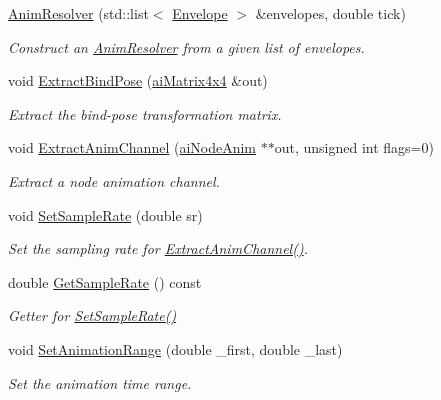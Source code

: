 \begin{DoxyCompactItemize}
\item 
\hyperlink{class_assimp_1_1_l_w_o_1_1_anim_resolver_a23fc374237cc755ae90e78fe2910a603}{Anim\+Resolver} (std\+::list$<$ \hyperlink{struct_assimp_1_1_l_w_o_1_1_envelope}{Envelope} $>$ \&envelopes, double tick)
\begin{DoxyCompactList}\small\item\em Construct an \hyperlink{class_assimp_1_1_l_w_o_1_1_anim_resolver}{Anim\+Resolver} from a given list of envelopes. \end{DoxyCompactList}\item 
void \hyperlink{class_assimp_1_1_l_w_o_1_1_anim_resolver_a9a10f3c63cbfa627b45c80cd4eca89e0}{Extract\+Bind\+Pose} (\hyperlink{structai_matrix4x4}{ai\+Matrix4x4} \&out)
\begin{DoxyCompactList}\small\item\em Extract the bind-\/pose transformation matrix. \end{DoxyCompactList}\item 
void \hyperlink{class_assimp_1_1_l_w_o_1_1_anim_resolver_a12c37cb4c519b65845333158ba72597f}{Extract\+Anim\+Channel} (\hyperlink{structai_node_anim}{ai\+Node\+Anim} $\ast$$\ast$out, unsigned int flags=0)
\begin{DoxyCompactList}\small\item\em Extract a node animation channel. \end{DoxyCompactList}\item 
void \hyperlink{class_assimp_1_1_l_w_o_1_1_anim_resolver_a7d58e5b987880986075c268e6a3233b1}{Set\+Sample\+Rate} (double sr)
\begin{DoxyCompactList}\small\item\em Set the sampling rate for \hyperlink{class_assimp_1_1_l_w_o_1_1_anim_resolver_a12c37cb4c519b65845333158ba72597f}{Extract\+Anim\+Channel()}. \end{DoxyCompactList}\item 
\hypertarget{class_assimp_1_1_l_w_o_1_1_anim_resolver_ad107c71e96b0fd5f6cc76b0ebcef4a6f}{double \hyperlink{class_assimp_1_1_l_w_o_1_1_anim_resolver_ad107c71e96b0fd5f6cc76b0ebcef4a6f}{Get\+Sample\+Rate} () const }\label{class_assimp_1_1_l_w_o_1_1_anim_resolver_ad107c71e96b0fd5f6cc76b0ebcef4a6f}

\begin{DoxyCompactList}\small\item\em Getter for \hyperlink{class_assimp_1_1_l_w_o_1_1_anim_resolver_a7d58e5b987880986075c268e6a3233b1}{Set\+Sample\+Rate()} \end{DoxyCompactList}\item 
void \hyperlink{class_assimp_1_1_l_w_o_1_1_anim_resolver_ac10180fa14bc1fb16f9d4d8f5a79fccf}{Set\+Animation\+Range} (double \+\_\+first, double \+\_\+last)
\begin{DoxyCompactList}\small\item\em Set the animation time range. \end{DoxyCompactList}\end{DoxyCompactItemize}
